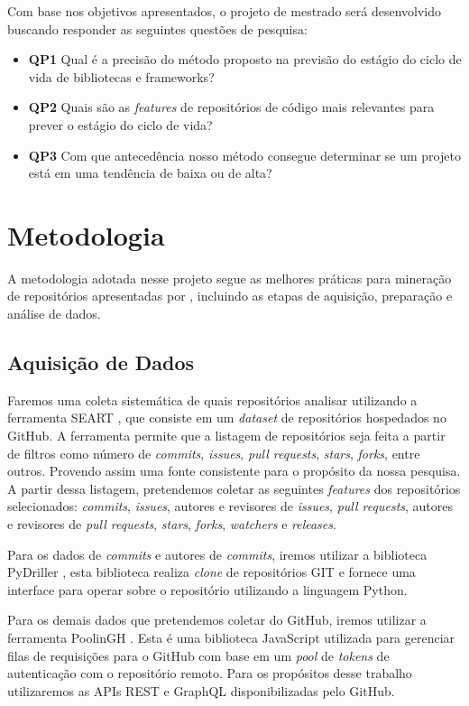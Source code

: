 \documentclass[11pt,a4paper]{article}
\newcommand{\en}[1]{\textit{#1}}
\begin{document}
Com base nos objetivos apresentados, o projeto de mestrado será desenvolvido buscando responder as seguintes questões de pesquisa:

\begin{itemize}
    \item \textbf{QP1} Qual é a precisão do método proposto na previsão do estágio do ciclo de vida de bibliotecas e frameworks?
    \item \textbf{QP2} Quais são as \en{features} de repositórios de código mais relevantes para prever o estágio do ciclo de vida?
    \item \textbf{QP3} Com que antecedência nosso método consegue determinar se um projeto está em uma tendência de baixa ou de alta?
\end{itemize}

\section{Metodologia}
A metodologia adotada nesse projeto segue as melhores práticas para mineração de repositórios apresentadas por \cite{cookbook}, incluindo as etapas de aquisição, preparação e análise de dados.

\subsection{Aquisição de Dados}
Faremos uma coleta sistemática de quais repositórios analisar utilizando a ferramenta SEART \cite{seart}, que consiste em um \en{dataset} de repositórios hospedados no GitHub. A ferramenta permite que a listagem de repositórios seja feita a partir de filtros como número de \en{commits}, \en{issues}, \en{pull requests}, \en{stars}, \en{forks}, entre outros. Provendo assim uma fonte consistente para o propósito da nossa pesquisa. A partir dessa listagem, pretendemos coletar as seguintes \en{features} dos repositórios selecionados: \en{commits}, \en{issues}, autores e revisores de \en{issues}, \en{pull requests}, autores e revisores de \en{pull requests}, \en{stars}, \en{forks}, \en{watchers} e \en{releases}.

Para os dados de \en{commits} e autores de \en{commits}, iremos utilizar a biblioteca PyDriller \cite{pydriller}, esta biblioteca realiza \en{clone} de repositórios GIT e fornece uma interface para operar sobre o repositório utilizando a linguagem Python.

Para os demais dados que pretendemos coletar do GitHub, iremos utilizar a ferramenta PoolinGH \cite{poolingh}. Esta é uma biblioteca JavaScript utilizada para gerenciar filas de requisições para o GitHub com base em um \en{pool} de \en{tokens} de autenticação com o repositório remoto. Para os propósitos desse trabalho utilizaremos as APIs REST e GraphQL disponibilizadas pelo GitHub.
\end{document}
